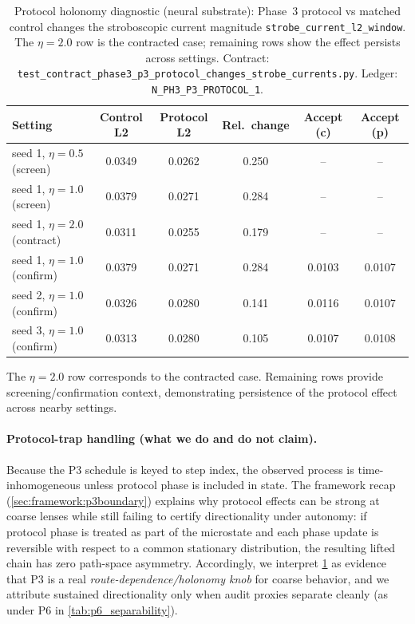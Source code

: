 \documentclass[11pt]{article}
\begin{document}
\begin{table}[t]
\centering
\small
\begin{tabular}{@{}l c c c c c@{}}
\toprule
Setting & Control L2 & Protocol L2 & Rel.\ change & Accept (c) & Accept (p) \\
\midrule
seed 1, $\eta{=}0.5$ (screen) & 0.0349 & 0.0262 & 0.250 & -- & -- \\
seed 1, $\eta{=}1.0$ (screen) & 0.0379 & 0.0271 & 0.284 & -- & -- \\
seed 1, $\eta{=}2.0$ (contract) & 0.0311 & 0.0255 & 0.179 & -- & -- \\
\addlinespace
seed 1, $\eta{=}1.0$ (confirm) & 0.0379 & 0.0271 & 0.284 & 0.0103 & 0.0107 \\
seed 2, $\eta{=}1.0$ (confirm) & 0.0326 & 0.0280 & 0.141 & 0.0116 & 0.0107 \\
seed 3, $\eta{=}1.0$ (confirm) & 0.0313 & 0.0280 & 0.105 & 0.0107 & 0.0108 \\
\bottomrule
\end{tabular}
\caption{Protocol holonomy diagnostic (neural substrate): Phase~3 protocol vs matched control changes the stroboscopic current magnitude \texttt{strobe\_current\_l2\_window}. The $\eta{=}2.0$ row is the contracted case; remaining rows show the effect persists across settings. Contract: \texttt{test\_contract\_phase3\_p3\_protocol\_changes\_strobe\_currents.py}. Ledger: \texttt{N\_PH3\_P3\_PROTOCOL\_1}.}
\label{tab:p3_protocol}
\end{table}
The $\eta=2.0$ row corresponds to the contracted case. Remaining rows provide screening/confirmation context, demonstrating persistence of the protocol effect across nearby settings.

\paragraph{Protocol-trap handling (what we do and do not claim).}
Because the P3 schedule is keyed to step index, the observed process is time-inhomogeneous unless protocol phase is included in state. The framework recap (\cref{sec:framework:p3boundary}) explains why protocol effects can be strong at coarse lenses while still failing to certify directionality under autonomy: if protocol phase is treated as part of the microstate and each phase update is reversible with respect to a common stationary distribution, the resulting lifted chain has zero path-space asymmetry. Accordingly, we interpret \cref{tab:p3_protocol} as evidence that P3 is a real \emph{route-dependence/holonomy knob} for coarse behavior, and we attribute sustained directionality only when audit proxies separate cleanly (as under P6 in \cref{tab:p6_separability}).
\end{document}
